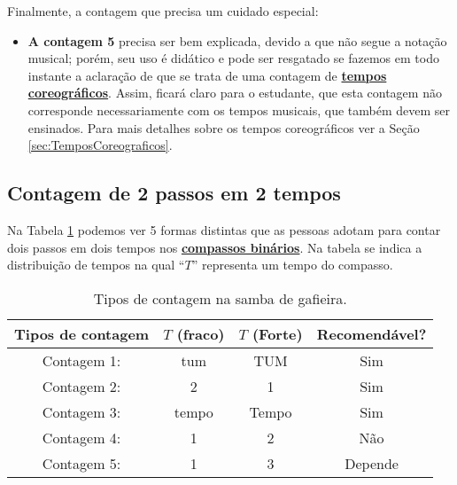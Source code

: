 Finalmente, a contagem que precisa um cuidado especial:
\begin{itemize}

\item \textbf{A contagem 5} precisa ser bem explicada, 
devido a que não segue a notação musical; 
porém, seu uso é didático e pode ser resgatado se fazemos em todo instante a aclaração de 
que se trata de uma contagem de \hyperref[sec:TemposCoreograficos]{\textbf{tempos coreográficos}}.
Assim, ficará claro para o estudante, 
que esta contagem não corresponde necessariamente com os tempos musicais, 
que também devem ser ensinados.
Para mais detalhes sobre os tempos coreográficos ver a Seção \ref{sec:TemposCoreograficos}.

\end{itemize}


\subsection{Contagem de 2 passos em 2 tempos}

Na Tabela \ref{tab:ritmoconta2}  podemos ver 5 formas distintas que as pessoas adotam 
para contar dois passos em dois tempos nos \hyperref[subsec:compassobinario]{\textbf{compassos binários}}.
Na tabela se indica a distribuição de tempos na qual ``$T$'' representa um tempo do compasso.

\begin{table}[ht]
  \centering
  \begin{tabular}    {c|cc|c}
    \hline
    Tipos de contagem       & $T$ (fraco)  & $T$ (Forte)& Recomendável?\\
    \hline
    Contagem 1: & tum  & TUM  & Sim\\
    Contagem 2: & 2     & 1     & Sim\\
    Contagem 3: & tempo & Tempo & Sim\\ \hline
    Contagem 4: & 1     & 2     & Não\\ \hline
    Contagem 5: & 1     & 3     & Depende\\  \hline
    \hline
  \end{tabular}
  \caption{Tipos de contagem na samba de gafieira.}
\label{tab:ritmoconta2}
\end{table}



